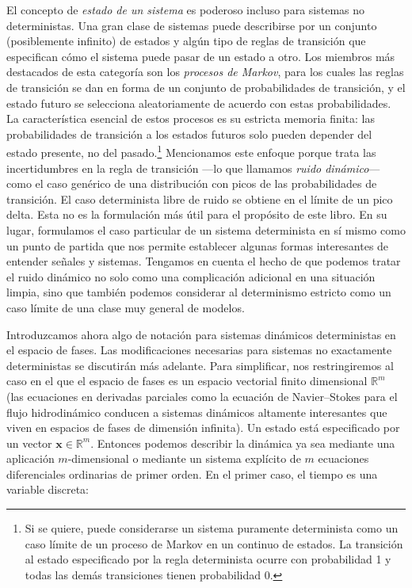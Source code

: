 \documentclass[10pt,a4paper]{book}
\begin{document}
\bigskip

El concepto de \textit{estado de un sistema} es poderoso incluso para sistemas no deterministas. Una gran clase de sistemas puede describirse por un conjunto (posiblemente infinito) de estados y algún tipo de reglas de transición que especifican cómo el sistema puede pasar de un estado a otro. Los miembros más destacados de esta categoría son los \textit{procesos de Markov}, para los cuales las reglas de transición se dan en forma de un conjunto de probabilidades de transición, y el estado futuro se selecciona aleatoriamente de acuerdo con estas probabilidades. La característica esencial de estos procesos es su estricta memoria finita: las probabilidades de transición a los estados futuros solo pueden depender del estado presente, no del pasado.\footnote{Si se quiere, puede considerarse un sistema puramente determinista como un caso límite de un proceso de Markov en un continuo de estados. La transición al estado especificado por la regla determinista ocurre con probabilidad 1 y todas las demás transiciones tienen probabilidad 0.} Mencionamos este enfoque porque trata las incertidumbres en la regla de transición —lo que llamamos \textit{ruido dinámico}— como el caso genérico de una distribución con picos de las probabilidades de transición. El caso determinista libre de ruido se obtiene en el límite de un pico delta. Esta no es la formulación más útil para el propósito de este libro. En su lugar, formulamos el caso particular de un sistema determinista en sí mismo como un punto de partida que nos permite establecer algunas formas interesantes de entender señales y sistemas. Tengamos en cuenta el hecho de que podemos tratar el ruido dinámico no solo como una complicación adicional en una situación limpia, sino que también podemos considerar al determinismo estricto como un caso límite de una clase muy general de modelos.

\newpage

Introduzcamos ahora algo de notación para sistemas dinámicos deterministas en el espacio de fases. Las modificaciones necesarias para sistemas no exactamente deterministas se discutirán más adelante. Para simplificar, nos restringiremos al caso en el que el espacio de fases es un espacio vectorial finito dimensional $\mathbb{R}^m$ (las ecuaciones en derivadas parciales como la ecuación de Navier–Stokes para el flujo hidrodinámico conducen a sistemas dinámicos altamente interesantes que viven en espacios de fases de dimensión infinita). Un estado está especificado por un vector $\mathbf{x} \in \mathbb{R}^m$. Entonces podemos describir la dinámica ya sea mediante una aplicación $m$-dimensional o mediante un sistema explícito de $m$ ecuaciones diferenciales ordinarias de primer orden. En el primer caso, el tiempo es una variable discreta:  
\end{document}
